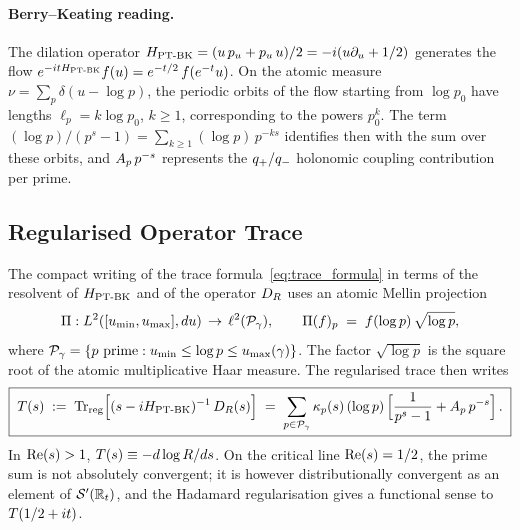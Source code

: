 \paragraph{Berry--Keating reading.}
The dilation operator
$H_{\mathrm{PT\text{-}BK}} = (u\,p_u + p_u\,u)/2 = -i(u\partial_u + 1/2)$ generates the flow
$e^{-itH_{\mathrm{PT\text{-}BK}}} f(u) = e^{-t/2}\,f(e^{-t}u)$. On the atomic measure
$\nu = \sum_p \delta(u - \log p)$, the periodic orbits of the flow
starting from $\log p_0$ have lengths $\ell_p = k \log p_0$, $k \ge 1$,
corresponding to the powers $p_0^{k}$. The term
$(\log p)/(p^s - 1) = \sum_{k \ge 1} (\log p)\,p^{-ks}$ identifies then
with the sum over these orbits, and $A_p\,p^{-s}$ represents the
$q_{+}/q_{-}$ holonomic coupling contribution per prime.

\subsection{Regularised Operator Trace}
\label{sec:trace_reg}

The compact writing of the trace formula~\eqref{eq:trace_formula} in
terms of the resolvent of $H_{\mathrm{PT\text{-}BK}}$ and of the operator $D_R$ uses an
atomic Mellin projection
\begin{equation}
\Pi : L^{2}([u_{\min}, u_{\max}], du) \,\to\, \ell^{2}(\mathcal{P}_\gamma),
\qquad \Pi(f)_p \;=\; f(\log p)\,\sqrt{\log p},
\label{eq:Pi_def}
\end{equation}
where $\mathcal{P}_\gamma = \{p \text{ prime} : u_{\min} \le \log p \le
u_{\max}(\gamma)\}$. The factor $\sqrt{\log p}$ is the square root of the
atomic multiplicative Haar measure. The regularised trace then writes
\begin{equation}
\boxed{\;
T(s) \;:=\; \operatorname{Tr}_{\mathrm{reg}}\!\Big[(s - iH_{\mathrm{PT\text{-}BK}})^{-1}\,D_R(s)\Big]
\;=\; \sum_{p \in \mathcal{P}_\gamma} \kappa_p(s)\,(\log p)\,\Big[\dfrac{1}{p^s - 1} + A_p\,p^{-s}\Big]\,.\;}
\label{eq:Treg}
\end{equation}
In $\operatorname{Re}(s) > 1$, $T(s) \equiv -d \log R/ds$. On the critical
line $\operatorname{Re}(s) = 1/2$, the prime sum is not absolutely convergent; it is
however distributionally convergent as an element of
$\mathcal{S}'(\mathbb{R}_t)$, and the Hadamard regularisation gives a
functional sense to $T(1/2 + it)$.

